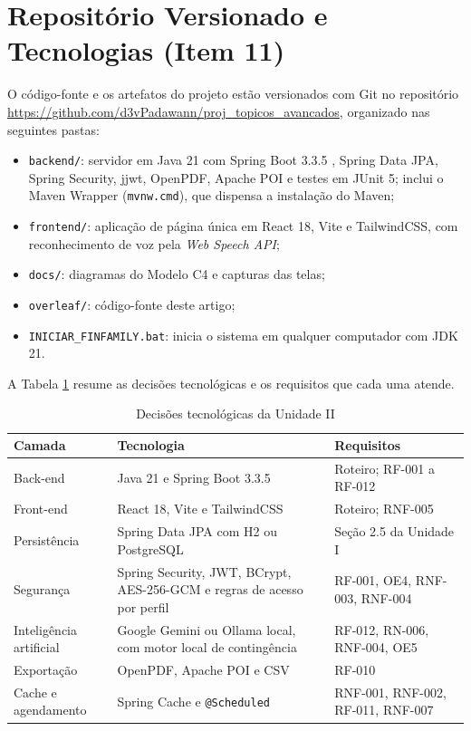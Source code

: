\documentclass[12pt,oneside,a4paper,article]{abntex2}
\begin{document}
\section{Repositório Versionado e Tecnologias (Item 11)}
\label{sec:repositorio}

O código-fonte e os artefatos do projeto estão versionados com Git no repositório \url{https://github.com/d3vPadawann/proj_topicos_avancados}, organizado nas seguintes pastas:

\begin{itemize}
    \item \texttt{backend/}: servidor em Java 21 com Spring Boot 3.3.5 \cite{spring2024}, Spring Data JPA, Spring Security, jjwt, OpenPDF, Apache POI e testes em JUnit 5; inclui o Maven Wrapper (\texttt{mvnw.cmd}), que dispensa a instalação do Maven;
    \item \texttt{frontend/}: aplicação de página única em React 18, Vite e TailwindCSS, com reconhecimento de voz pela \textit{Web Speech API};
    \item \texttt{docs/}: diagramas do Modelo C4 e capturas das telas;
    \item \texttt{overleaf/}: código-fonte deste artigo;
    \item \texttt{INICIAR\_FINFAMILY.bat}: inicia o sistema em qualquer computador com JDK 21.
\end{itemize}

A Tabela \ref{tab:tecnologias} resume as decisões tecnológicas e os requisitos que cada uma atende.

\begin{table}[H]
\centering
\caption{Decisões tecnológicas da Unidade II}
\label{tab:tecnologias}
\begin{tabularx}{\textwidth}{p{3.4cm}Xp{4.2cm}}
\toprule
\textbf{Camada} & \textbf{Tecnologia} & \textbf{Requisitos} \\
\midrule
Back-end & Java 21 e Spring Boot 3.3.5 & Roteiro; RF-001 a RF-012 \\
Front-end & React 18, Vite e TailwindCSS & Roteiro; RNF-005 \\
Persistência & Spring Data JPA com H2 ou PostgreSQL & Seção 2.5 da Unidade I \\
Segurança & Spring Security, JWT, BCrypt, AES-256-GCM e regras de acesso por perfil & RF-001, OE4, RNF-003, RNF-004 \\
Inteligência artificial & Google Gemini \cite{google2026} ou Ollama local, com motor local de contingência & RF-012, RN-006, RNF-004, OE5 \\
Exportação & OpenPDF, Apache POI e CSV & RF-010 \\
Cache e agendamento & Spring Cache e \texttt{@Scheduled} & RNF-001, RNF-002, RF-011, RNF-007 \\
\bottomrule
\end{tabularx}
\end{table}
\end{document}
